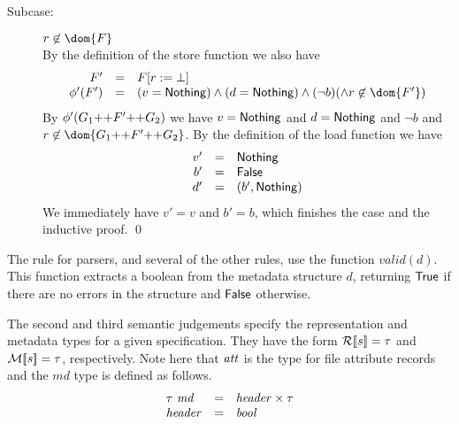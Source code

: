 {\begin{description}
\begin{description}
\item[Subcase:] $r \not\in \dom{F}$\\[1ex]
%
By the definition of the store function we also have
\[
\begin{array}{rcll}
F' &=& \FDelete{F}{r}\\
\phi'(F') &=& (v = \Nothing) \wedge (d = \Nothing) \wedge (\neg b) (\wedge r \not\in \dom{F'})
\end{array}
\]
By $\phi'(G_1 \text{++} F' \text{++} G_2)$ we have $v = \mathsf{Nothing}$ and $d
= \mathsf{Nothing}$ and $\neg b$ and $r \not\in \dom{G_1 \FAppend F' \FAppend
  G_2}$.
%
By the definition of the load function we have 
\[ 
\begin{array}{rcll}
v' &=& \mathsf{Nothing}\\
b' &=& \mathsf{False}\\
d' &=& (b',\mathsf{Nothing})\\
\end{array}
\]
%
We immediately have $v' = v$ and $b' = b$, which finishes the case and
the inductive proof. \hfill \qed
\end{description}
\end{description}}


The rule for \padshaskell{} parsers, and several of the other rules,
use the function $valid(d)$.  This function extracts a boolean from
the metadata structure $d$, returning $\mathsf{True}$ if there are no errors
in the structure and $\mathsf{False}$ otherwise.

The second and third semantic judgements specify the representation
and metadata types for a given specification.  They have the form
${\cal R}[\![ s ]\!] = \tau$ and ${\cal M}[\![ s ]\!] = \tau$, respectively.  Note here
that $\mathit{att}$ is the type for file attribute records and the 
$md$ type is defined as follows.
\[
\begin{array}{lcl}
\tau~\mathit{md} & = & \mathit{header} \times \tau \\
\mathit{header} & = & \mathit{bool} 
\end{array}
\]


